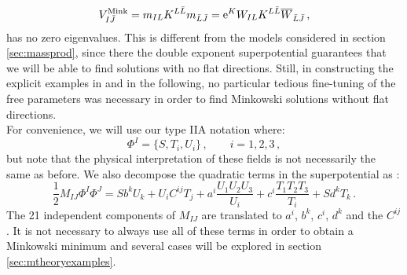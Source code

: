 \documentclass[a4paper,12pt]{report}
\newcommand{\be}{\begin{equation}}
\newcommand{\ee}{\end{equation}}
\def\rme{{\rm e}}
\begin{document}
\be 
V_{I\bar{J}}^{\text{Mink}} = m_{IL} K^{L\bar{L}} m_{\bar{L}\bar{J}} = \rme^K W_{IL} K^{L\bar{L}} \overline{W}_{\bar{L}\bar{J}}\,,
\ee
has no zero eigenvalues. This is different from the models considered in section \ref{sec:massprod}, since there the double exponent superpotential guarantees that we will be able to find solutions with no flat directions. Still, in constructing the explicit examples in \cite{Cribiori:2019hrb} and in the following, no particular tedious fine-tuning of the free parameters was necessary in order to find Minkowski solutions without flat directions.\\
For convenience, we will use our type IIA notation where:
\be 
\Phi^I = \{S,T_i,U_i\}\,,\qquad i=1,2,3\,,
\ee
but note that the physical interpretation of these fields is not necessarily the same as before. We also decompose the quadratic terms in the superpotential as \cite{Derendinger:2014wwa}:
\be 
\label{eq:mtheoryW}
\frac{1}{2} M_{IJ} \Phi^I \Phi^J = S b^k U_k + U_i C^{ij} T_j + a^i \frac{U_1 U_2 U_3}{U_i} + c^i \frac{T_1 T_2 T_3}{T_i} + S d^k T_k\,.
\ee
The 21 independent components of $M_{IJ}$ are translated to $a^i$, $b^k$, $c^i$, $d^k$ and the $C^{ij}$. It is not necessary to always use all of these terms in order to obtain a Minkowski minimum and several cases will be explored in section \ref{sec:mtheoryexamples}. 
\end{document}
